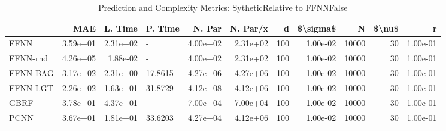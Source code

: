 \begin{table}
\centering
\caption{Prediction and Complexity Metrics: SytheticRelative to FFNNFalse}
\label{tab__Sythetic__Fix_Neurons_QTrue}
\begin{tabular}{lrrlrrrrrrr}
\toprule
{} &      MAE &  L. Time &  P. Time &   N. Par &  N. Par/x &    d &  \$\textbackslash sigma\$ &      N &  \$\textbackslash nu\$ &        r \\
\midrule
FFNN     & 3.59e+01 & 2.31e+02 &        - & 4.00e+02 &  2.31e+02 &  100 &  1.00e-02 &  10000 &     30 & 1.00e-01 \\
FFNN-rnd & 4.26e+05 & 1.88e-02 &        - & 4.00e+02 &  2.31e+02 &  100 &  1.00e-02 &  10000 &     30 & 1.00e-01 \\
FFNN-BAG & 3.17e+02 & 2.31e+00 &  17.8615 & 4.27e+06 &  4.27e+06 &  100 &  1.00e-02 &  10000 &     30 & 1.00e-01 \\
FFNN-LGT & 2.26e+02 & 1.63e+01 &  31.8729 & 4.12e+08 &  4.12e+06 &  100 &  1.00e-02 &  10000 &     30 & 1.00e-01 \\
GBRF     & 3.78e+01 & 4.37e+01 &        - & 7.00e+04 &  7.00e+04 &  100 &  1.00e-02 &  10000 &     30 & 1.00e-01 \\
PCNN     & 3.67e+01 & 1.81e+01 &  33.6203 & 4.27e+04 &  4.12e+06 &  100 &  1.00e-02 &  10000 &     30 & 1.00e-01 \\
\bottomrule
\end{tabular}
\end{table}
